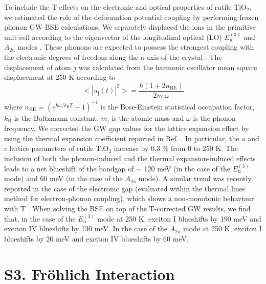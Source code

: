 \documentclass[aps,prl,twocolumn,amsfonts,nobibnotes,superscriptaddress,showpacs]{revtex4-1}
\begin{document}
To include the T-effects on the electronic and optical properties of rutile TiO$_2$, we estimated the role of the deformation potential coupling by performing frozen phonon GW-BSE calculations. We separately displaced the ions in the primitive unit cell according to the eigenvector of the longitudinal optical (LO) $E\mathrm{_{u}^{(3)}}$ and $A\mathrm{_{2u}}$ modes \cite{traylor1971lattice}. These phonons are expected to possess the strongest coupling with the electronic degrees of freedom along the a-axis of the crystal \cite{ref:deskins, moser2013tunable}. The displacement of atom $j$ was calculated from the harmonic oscillator mean square displacement at 250 K according to
\begin{equation}
< |u\mathrm{_{j}}(t)|^2> =\frac{\hbar(1 + 2n_\mathrm{{BE}})}{2 m\mathrm{_j} \omega}
\end{equation}
where $n_\mathrm{{BE}} = (e^{\hbar\omega/k\mathrm{_B} T} - 1)^{-1}$ is the Bose-Einstein statistical occupation factor, $k\mathrm{_B}$ is the Boltzmann constant, $m\mathrm{_j}$ is the atomic mass and $\omega$ is the phonon frequency. We corrected the GW gap values for the lattice expansion effect by using the thermal expansion coefficient reported in Ref. \cite{rao1970thermal}. In particular, the $a$ and $c$ lattice parameters of rutile TiO$_2$ increase by 0.3 $\%$ from 0 to 250 K. The inclusion of both the phonon-induced and the thermal expansion-induced effects leads to a net blueshift of the bandgap of $\sim$ 120 meV (in the case of the $E\mathrm{_{u}^{(3)}}$ mode) and 60 meV (in the case of the $A\mathrm{_{2u}}$ mode). A similar trend was recently reported in the case of the electronic gap (evaluated within the thermal lines method for electron-phonon coupling), which shows a non-monotonic behaviour with T \cite{monserrat2016correlation}. When solving the BSE on top of the T-corrected GW results, we find that, in the case of the $E\mathrm{_{u}^{(3)}}$ mode at 250 K, exciton I blueshifts by 190 meV and exciton IV blueshifts by 130 meV. In the case of the $A\mathrm{_{2u}}$ mode at 250 K, exciton I blueshifts by 20 meV and exciton IV blueshifts by 60 meV.

\section{S3. Fr\"ohlich Interaction}
\end{document}
